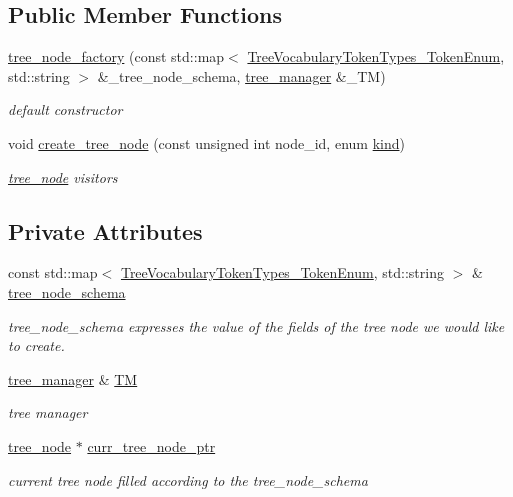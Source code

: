 \subsection*{Public Member Functions}
\begin{DoxyCompactItemize}
\item 
\hyperlink{structtree__node__factory_ad35b91bf63870cd88d38af674a3d4c38}{tree\+\_\+node\+\_\+factory} (const std\+::map$<$ \hyperlink{token__interface_8hpp_a14502d0757789149f644966ca931b126}{Tree\+Vocabulary\+Token\+Types\+\_\+\+Token\+Enum}, std\+::string $>$ \&\+\_\+tree\+\_\+node\+\_\+schema, \hyperlink{classtree__manager}{tree\+\_\+manager} \&\+\_\+\+TM)
\begin{DoxyCompactList}\small\item\em default constructor \end{DoxyCompactList}\item 
void \hyperlink{structtree__node__factory_a54487c2d0dfeeab04df6242dc59dd78f}{create\+\_\+tree\+\_\+node} (const unsigned int node\+\_\+id, enum \hyperlink{tree__common_8hpp_a9efbd7c7191fb190b76c2fd05d6e7b45}{kind})
\begin{DoxyCompactList}\small\item\em \hyperlink{classtree__node}{tree\+\_\+node} visitors \end{DoxyCompactList}\end{DoxyCompactItemize}
\subsection*{Private Attributes}
\begin{DoxyCompactItemize}
\item 
const std\+::map$<$ \hyperlink{token__interface_8hpp_a14502d0757789149f644966ca931b126}{Tree\+Vocabulary\+Token\+Types\+\_\+\+Token\+Enum}, std\+::string $>$ \& \hyperlink{structtree__node__factory_af6be06f05d1d0cd8440af1ef4e2a04e6}{tree\+\_\+node\+\_\+schema}
\begin{DoxyCompactList}\small\item\em tree\+\_\+node\+\_\+schema expresses the value of the fields of the tree node we would like to create. \end{DoxyCompactList}\item 
\hyperlink{classtree__manager}{tree\+\_\+manager} \& \hyperlink{structtree__node__factory_ab189b3cf80040fd623a6dff783cbcc91}{TM}
\begin{DoxyCompactList}\small\item\em tree manager \end{DoxyCompactList}\item 
\hyperlink{classtree__node}{tree\+\_\+node} $\ast$ \hyperlink{structtree__node__factory_aa05bb70210c04021d483f7935410e91c}{curr\+\_\+tree\+\_\+node\+\_\+ptr}
\begin{DoxyCompactList}\small\item\em current tree node filled according to the tree\+\_\+node\+\_\+schema \end{DoxyCompactList}\end{DoxyCompactItemize}



